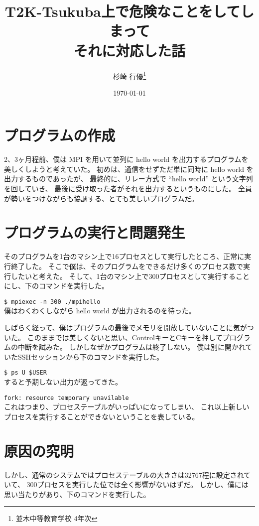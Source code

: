 \documentclass[a4j,10pt]{jarticle}
\title{T2K-Tsukuba上で危険なことをしてしまって \\ それに対応した話}
\author{杉崎 行優\thanks{並木中等教育学校 4年次}}
\date{\today}
\begin{document}
\maketitle

\tableofcontents
\newpage

\section{プログラムの作成}
2、3ヶ月程前、僕は MPI を用いて並列に hello world を出力するプログラムを
美しくしようと考えていた。
初めは、通信をせずただ単に同時に hello world を出力するものであったが、
最終的に、リレー方式で ``hello world'' という文字列を回していき、
最後に受け取った者がそれを出力するというものにした。
全員が勢いをつけながらも協調する、とても美しいプログラムだ。

\section{プログラムの実行と問題発生}
そのプログラムを1台のマシン上で16プロセスとして実行したところ、正常に実行終了した。
そこで僕は、そのプログラムをできるだけ多くのプロセス数で実行したいと考えた。
そして、1台のマシン上で300プロセスとして実行することにし、下のコマンドを実行した。

\texttt{\$ mpiexec -n 300 ./mpihello} \\
僕はわくわくしながら hello world が出力されるのを待った。

しばらく経って、僕はプログラムの最後でメモリを開放していないことに気がついた。
このままでは美しくないと思い、ControlキーとCキーを押してプログラムの中断を試みた。
しかしなぜかプログラムは終了しない。
僕は別に開かれていたSSHセッションから下のコマンドを実行した。

\texttt{\$ ps U \$USER} \\
すると予期しない出力が返ってきた。

\texttt{fork: resource temporary unavilable} \\
これはつまり、プロセステーブルがいっぱいになってしまい、
これ以上新しいプロセスを実行することができないということを表している。

\section{原因の究明}
しかし、通常のシステムではプロセステーブルの大きさは32767程に設定されていて、
300プロセスを実行した位では全く影響がないはずだ。
しかし、僕には思い当たりがあり、下のコマンドを実行した。
\end{document}
